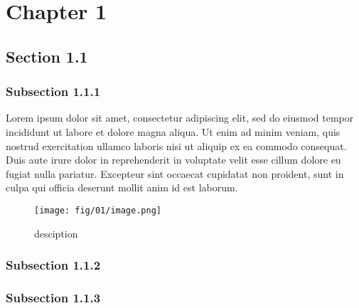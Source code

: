 \chapter{Chapter 1}
\label{chap_01}

\section{Section 1.1}


\subsection{Subsection 1.1.1}

Lorem ipsum dolor sit amet, consectetur adipiscing elit, sed do eiusmod tempor incididunt ut labore et dolore magna aliqua. Ut enim ad minim veniam, quis nostrud exercitation ullamco laboris nisi ut aliquip ex ea commodo consequat. Duis aute irure dolor in reprehenderit in voluptate velit esse cillum dolore eu fugiat nulla pariatur. Excepteur sint occaecat cupidatat non proident, sunt in culpa qui officia deserunt mollit anim id est laborum.

\begin{figure}
\begin{center}
\texttt{[image: fig/01/image.png]}
\end{center}
\caption{desciption}
\label{fig:T2K_crosssection}
\end{figure}



\subsection{Subsection 1.1.2}


\subsection{Subsection 1.1.3}


